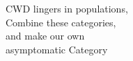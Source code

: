 \documentclass[preview]{standalone}
\begin{document}
\begin{center}
CWD lingers in populations,\\Combine these categories,\\and make our own\\asymptomatic Category
\end{center}
\end{document}

